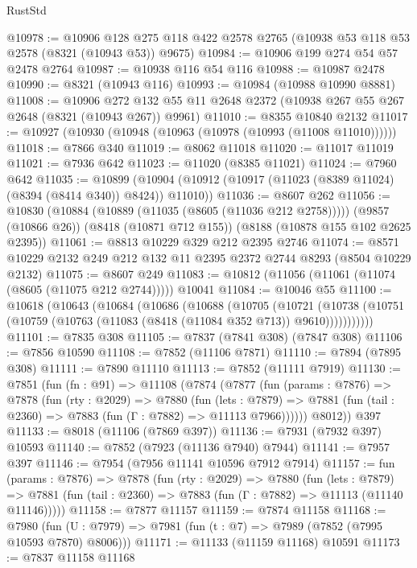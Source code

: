 \begin{lexlean}{RustStd}
\begin{coremodule}
@10978 := @10906
    @128
    @275
    @118
    @422
    @2578
    @2765
    (@10938 @53 @118 @53 @2578 (@8321 (@10943 @53)) @9675)
@10984 := @10906 @199 @274 @54 @57 @2478 @2764
@10987 := @10938 @116 @54 @116
@10988 := @10987 @2478
@10990 := @8321 (@10943 @116)
@10993 := @10984 (@10988 @10990 @8881)
@11008 := @10906
    @272
    @132
    @55
    @11
    @2648
    @2372
    (@10938 @267 @55 @267 @2648 (@8321 (@10943 @267)) @9961)
@11010 := @8355 @10840 @2132
@11017 := @10927 (@10930 (@10948 (@10963 (@10978 (@10993 (@11008 @11010))))))
@11018 := @7866 @340
@11019 := @8062 @11018
@11020 := @11017 @11019
@11021 := @7936 @642
@11023 := @11020 (@8385 @11021)
@11024 := @7960 @642
@11035 := @10899
    (@10904 (@10912 (@10917 (@11023 (@8389 @11024) (@8394 (@8414 @340)) @8424)) @11010))
@11036 := @8607 @262
@11056 := @10830
    (@10884 (@10889 (@11035 (@8605 (@11036 @212 @2758)))))
    (@9857 (@10866 @26))
    (@8418 (@10871 @712 @155))
    (@8188 (@10878 @155 @102 @2625 @2395))
@11061 := @8813 @10229 @329 @212 @2395 @2746
@11074 := @8571 @10229 @2132 @249 @212 @132 @11 @2395 @2372 @2744 @8293 (@8504 @10229 @2132)
@11075 := @8607 @249
@11083 := @10812 (@11056 (@11061 (@11074 (@8605 (@11075 @212 @2744))))) @10041
@11084 := @10046 @55
@11100 := @10618
    (@10643
      (@10684
        (@10686
          (@10688
            (@10705
              (@10721
                (@10738 (@10751 (@10759 (@10763 (@11083 (@8418 (@11084 @352 @713)) @9610)))))))))))
@11101 := @7835 @308
@11105 := @7837 (@7841 @308) (@7847 @308)
@11106 := @7856 @10590
@11108 := @7852 (@11106 @7871)
@11110 := @7894 (@7895 @308)
@11111 := @7890 @11110
@11113 := @7852 (@11111 @7919)
@11130 := @7851
    (fun (fn : @91) =>
    @11108
      (@7874
        (@7877
          (fun (params : @7876) =>
          @7878
            (fun (rty : @2029) =>
            @7880
              (fun (lets : @7879) =>
              @7881 (fun (tail : @2360) => @7883 (fun (Γ : @7882) => @11113 @7966))))))
        @8012))
    @397
@11133 := @8018 (@11106 (@7869 @397))
@11136 := @7931 (@7932 @397) @10593
@11140 := @7852 (@7923 (@11136 @7940) @7944)
@11141 := @7957 @397
@11146 := @7954 (@7956 @11141 @10596 @7912 @7914)
@11157 := fun (params : @7876) =>
  @7878
    (fun (rty : @2029) =>
    @7880
      (fun (lets : @7879) =>
      @7881 (fun (tail : @2360) => @7883 (fun (Γ : @7882) => @11113 (@11140 @11146)))))
@11158 := @7877 @11157
@11159 := @7874 @11158
@11168 := @7980
    (fun (U : @7979) => @7981 (fun (t : @7) => @7989 (@7852 (@7995 @10593 @7870) @8006)))
@11171 := @11133 (@11159 @11168) @10591
@11173 := @7837 @11158 @11168

\end{coremodule}
\end{lexlean}
